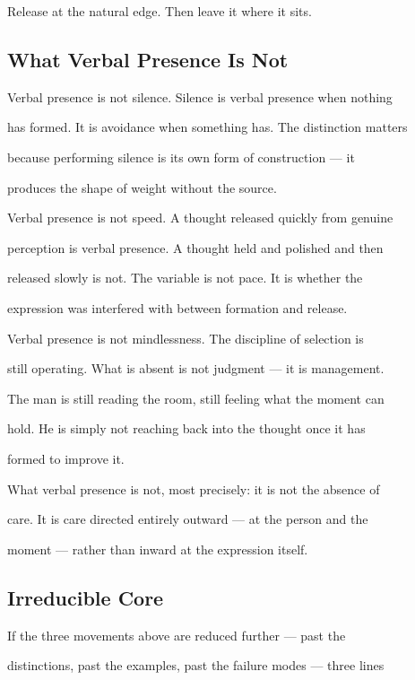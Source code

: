 \documentclass[12pt, a4paper]{article}
\begin{document}
Release at the natural edge. Then leave it where it sits.


\subsection{What Verbal Presence Is Not}

Verbal presence is not silence. Silence is verbal presence when nothing

has formed. It is avoidance when something has. The distinction matters

because performing silence is its own form of construction --- it

produces the shape of weight without the source.

Verbal presence is not speed. A thought released quickly from genuine

perception is verbal presence. A thought held and polished and then

released slowly is not. The variable is not pace. It is whether the

expression was interfered with between formation and release.

Verbal presence is not mindlessness. The discipline of selection is

still operating. What is absent is not judgment --- it is management.

The man is still reading the room, still feeling what the moment can

hold. He is simply not reaching back into the thought once it has

formed to improve it.

What verbal presence is not, most precisely: it is not the absence of

care. It is care directed entirely outward --- at the person and the

moment --- rather than inward at the expression itself.


\subsection*{Irreducible Core}

If the three movements above are reduced further --- past the

distinctions, past the examples, past the failure modes --- three lines
\end{document}
